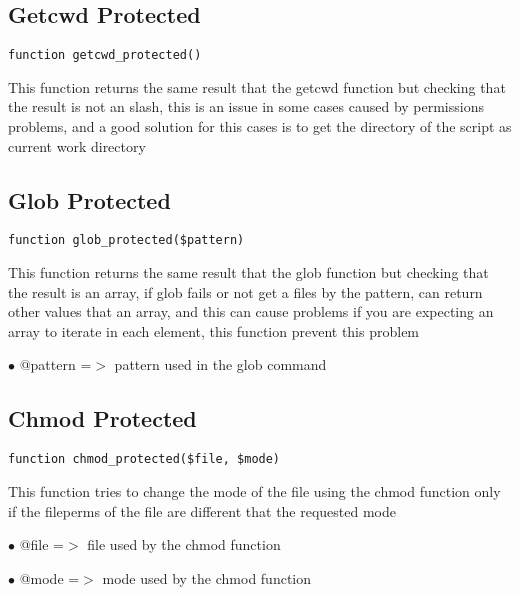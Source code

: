 \documentclass[a4paper]{book}
\begin{document}
\hypertarget{toc129}{}
\subsection{Getcwd Protected}

\begin{lstlisting}
function getcwd_protected()
\end{lstlisting}

This function returns the same result that the getcwd function but checking
that the result is not an slash, this is an issue in some cases caused by
permissions problems, and a good solution for this cases is to get the directory
of the script as current work directory

\hypertarget{toc130}{}
\subsection{Glob Protected}

\begin{lstlisting}
function glob_protected($pattern)
\end{lstlisting}

This function returns the same result that the glob function but checking
that the result is an array, if glob fails or not get a files by the pattern,
can return other values that an array, and this can cause problems if you are
expecting an array to iterate in each element, this function prevent this
problem

\begin{compactitem}
\item[\color{myblue}$\bullet$] @pattern =$>$ pattern used in the glob command
\end{compactitem}

\hypertarget{toc131}{}
\subsection{Chmod Protected}

\begin{lstlisting}
function chmod_protected($file, $mode)
\end{lstlisting}

This function tries to change the mode of the file using the chmod function
only if the fileperms of the file are different that the requested mode

\begin{compactitem}
\item[\color{myblue}$\bullet$] @file =$>$ file used by the chmod function
\item[\color{myblue}$\bullet$] @mode =$>$ mode used by the chmod function
\end{compactitem}
\end{document}
